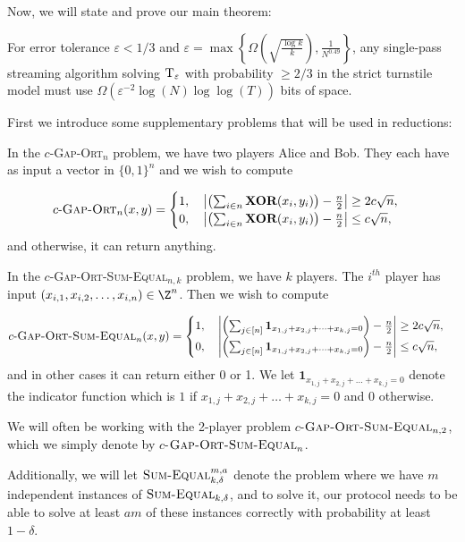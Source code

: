 \documentclass{toc}
\newcommand{\set}[1]{{\left \{{#1} \right \}}}
\newcommand{\gap}{\ensuremath{\varepsilon}}
\newcommand{\bigomega}[1]{\ensuremath{{\Omega \left( {#1} \right)}}}
\newcommand{\sumequal}{\textsc{Sum-Equal} }
\newcommand{\hest}{ \textsc{T} }
\newcommand{\go}{\textsc{Gap-Ort}}
\newcommand{\gose}{\textsc{Gap-Ort-Sum-Equal}}
\begin{document}
Now, we will state and prove our main theorem:
\begin{theorem}\label{thm:L0}
	For error tolerance $\gap <1/3$ and $\gap=\max\set{\bigomega{ \sqrt{\frac{\log k}{k}}}, \frac{1}{{N}^{0.49}}}$, 
	any single-pass streaming algorithm solving $\hest_\gap$ with probability $\ge 2/3$ in the strict turnstile model
	must use $\bigomega{\gap^{-2}\log (N)\log\log(T)}$ bits of space.
\end{theorem}

First we introduce some supplementary problems that will be used in reductions:

\begin{definition}
In the $c$-\go$_n$ problem, we have two players Alice and Bob. They each have as input a vector in $\{0,1\}^n$ and we wish to compute 

$$c\text{-}\go_n(x,y) = \begin{cases}
1, \quad \left|\left(\sum_{i \in n} \textbf{XOR}(x_i,y_i)\right) - \frac{n}{2}\right| \ge 2c\sqrt{n},\\
0, \quad \left|\left(\sum_{i \in n}  \textbf{XOR}(x_i,y_i)\right) - \frac{n}{2}\right| \le c\sqrt{n},\\
\end{cases}
$$
and otherwise, it can return anything.
\end{definition}
{\color{black}
\begin{definition}
In the $c$-\gose$_{n,k}$ problem, we have $k$ players. The $i^{th}$ player has input $(x_{i,1}, x_{i,2}, \dots, x_{i,n}) \in \Z^n$. Then we wish to compute

$$c\text{-}\gose_n(x,y) = \begin{cases}
1, \quad \left|\left(\sum_{j \in [n]} \mathbf{1}_{x_{1,j} + x_{2,j} + \dots + x_{k,j}= 0}\right) - \frac{n}{2}\right| \ge 2c\sqrt{n},\\
0, \quad \left|\left(\sum_{j \in [n]} \mathbf{1}_{x_{1,j} + x_{2,j} + \dots + x_{k,j}= 0}\right) - \frac{n}{2}\right| \le c\sqrt{n},\\
\end{cases}
$$
and in other cases it can return either 0 or 1. We let $\mathbf{1}_{x_{1,j} + x_{2,j} + \dots + x_{k,j}= 0}$ denote the indicator function which is $1$ if $x_{1,j} + x_{2,j} + \dots + x_{k,j}= 0$ and $0$ otherwise.
%

We will often be working with the 2-player problem $c$-$\gose_{n,2}$, which we simply denote by $c$-$\gose_n$.
\end{definition}
}
Additionally, we will let $\sumequal_{k,\delta}^{m,a}$ denote the problem where we have $m$ independent instances of $\sumequal_{k,\delta}$, and to solve it, our protocol needs to be able to solve at least $am$ of these instances correctly with probability at least $1-\delta$.
\end{document}
